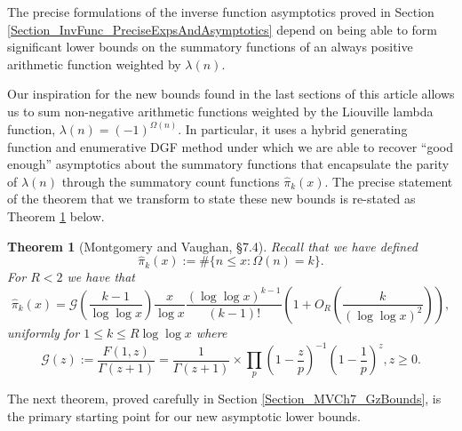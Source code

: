 \documentclass[11pt,reqno,a4letter]{article}
\numberwithin{figure}{section}
\numberwithin{table}{section}
\theoremstyle{plain}
\newtheorem{theorem}{Theorem}
\numberwithin{theorem}{section}
\theoremstyle{definition}
\begin{document}
The precise formulations of the inverse function asymptotics 
proved in Section \ref{Section_InvFunc_PreciseExpsAndAsymptotics} depend on being able to form 
significant lower bounds on the summatory functions of an always positive arithmetic function 
weighted by $\lambda(n)$. 

Our inspiration for the new bounds found in the last sections of this article allows us to sum 
non-negative arithmetic functions weighted by the Liouville lambda function, 
$\lambda(n) = (-1)^{\Omega(n)}$. In particular, it uses a hybrid generating function and 
enumerative DGF method 
under which we are able to recover ``good enough'' asymptotics about the summatory functions that 
encapsulate the parity of $\lambda(n)$ through the summatory count functions $\widehat{\pi}_k(x)$. 
The precise statement of the theorem that we transform to state these new bounds is re-stated as 
Theorem \ref{theorem_HatPi_ExtInTermsOfGz} below. 

\begin{theorem}[Montgomery and Vaughan, \S 7.4]
\label{theorem_HatPi_ExtInTermsOfGz} 
Recall that we have defined 
$$\widehat{\pi}_k(x) := \#\{n \leq x: \Omega(n)=k\}.$$ 
For $R < 2$ we have that 
\[
\widehat{\pi}_k(x) = \mathcal{G}\left(\frac{k-1}{\log\log x}\right) \frac{x}{\log x} 
     \frac{(\log\log x)^{k-1}}{(k-1)!} \left(1 + O_R\left(\frac{k}{(\log\log x)^2}\right)\right),  
\]
uniformly for $1 \leq k \leq R \log\log x$ where 
\[
\mathcal{G}(z) := \frac{F(1, z)}{\Gamma(z+1)} = \frac{1}{\Gamma(z+1)} \times 
     \prod_p \left(1-\frac{z}{p}\right)^{-1} \left(1-\frac{1}{p}\right)^z, z \geq 0. 
\]
\end{theorem} 

The next theorem, proved carefully in Section \ref{Section_MVCh7_GzBounds}, 
is the primary starting point for our new asymptotic lower bounds. 
\end{document}
